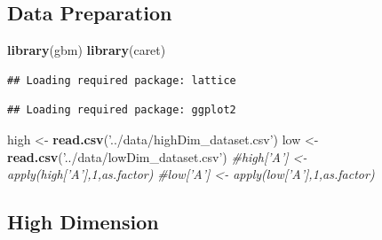 \documentclass[]{article}
\newenvironment{Shaded}{\begin{snugshade}}{\end{snugshade}}
\newcommand{\CommentTok}[1]{\textcolor[rgb]{0.56,0.35,0.01}{\textit{#1}}}
\newcommand{\KeywordTok}[1]{\textcolor[rgb]{0.13,0.29,0.53}{\textbf{#1}}}
\newcommand{\NormalTok}[1]{#1}
\newcommand{\StringTok}[1]{\textcolor[rgb]{0.31,0.60,0.02}{#1}}
\begin{document}
\hypertarget{data-preparation}{%
\subsection{Data Preparation}\label{data-preparation}}

\begin{Shaded}
\begin{Highlighting}[]
\KeywordTok{library}\NormalTok{(gbm)}
\KeywordTok{library}\NormalTok{(caret)}
\end{Highlighting}
\end{Shaded}

\begin{verbatim}
## Loading required package: lattice
\end{verbatim}

\begin{verbatim}
## Loading required package: ggplot2
\end{verbatim}

\begin{Shaded}
\begin{Highlighting}[]
\NormalTok{high <-}\StringTok{ }\KeywordTok{read.csv}\NormalTok{(}\StringTok{'../data/highDim_dataset.csv'}\NormalTok{)}
\NormalTok{low <-}\StringTok{ }\KeywordTok{read.csv}\NormalTok{(}\StringTok{'../data/lowDim_dataset.csv'}\NormalTok{)}
\CommentTok{#high['A'] <- apply(high['A'],1,as.factor)}
\CommentTok{#low['A'] <- apply(low['A'],1,as.factor)}
\end{Highlighting}
\end{Shaded}

\hypertarget{high-dimension}{%
\subsection{High Dimension}\label{high-dimension}}
\end{document}
